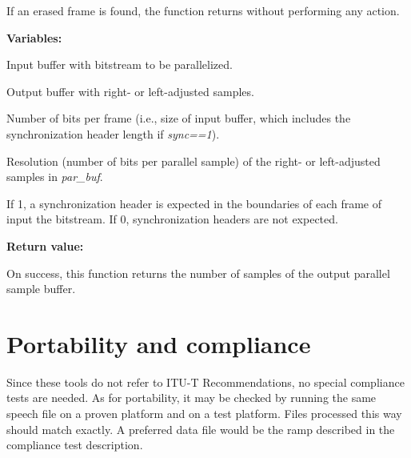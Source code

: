 If an erased frame is found, the function returns without performing
any action.

{\bf Variables: }
\begin{Descr}{\DescrLen}
\item[\pbox{20mm}{\em bit\_stm}] %
                    Input buffer with bitstream to be parallelized.

\item[\pbox{20mm}{\em par\_buf}] %
                    Output buffer with right- or left-adjusted samples.

\item[\pbox{20mm}{\em bs\_len}] %
                    Number of bits per frame (i.e., size of input buffer,
                    which includes the synchronization header length
                    if {\em sync==1}).

\item[\pbox{20mm}{\em resol}] %
                    Resolution (number of bits per parallel sample) of
                    the right- or left-adjusted samples in {\em par\_buf}.

\item[\pbox{20mm}{\em sync}] %
                    If 1, a synchronization header is expected in the
                    boundaries of each frame of input the bitstream.
                    If 0, synchronization headers are not expected.
\end{Descr}

{\bf Return value: }

On success, this function returns the number of samples of the output
parallel sample buffer.


\section{Portability and compliance} \label{Utl-port}

Since these tools do not refer to ITU-T Recommendations, no special
compliance tests are needed. As for portability, it may be checked by
running the same speech file on a proven platform and on a test
platform. Files processed this way should match exactly. A preferred
data file would be the ramp described in the compliance test
description.

